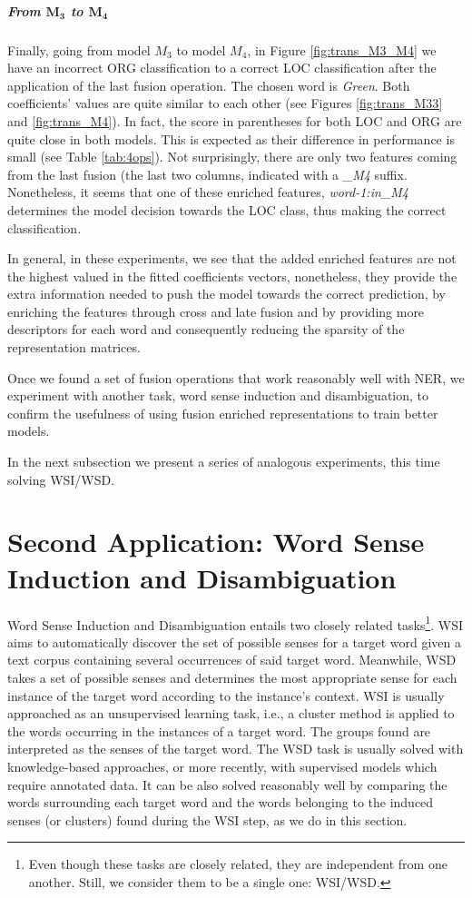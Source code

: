 \subparagraph{From $\mathbf{M_3}$ to $\mathbf{M_4}$} Finally, going from model $M_3 $ to model $M_4$, in Figure \ref{fig:trans_M3_M4} we have an incorrect ORG classification to a correct LOC classification after the application of the last fusion operation. The chosen word is \textit{Green}. Both coefficients' values are quite similar  to each other (see Figures \ref{fig:trans_M33} and \ref{fig:trans_M4}). In fact, the score in parentheses for both LOC and ORG are quite close in both models. This is expected as their difference in performance is small (see Table \ref{tab:4ops}). Not surprisingly, there are only two features coming from the last fusion (the last two columns, indicated with a \textit{\_M4} suffix. Nonetheless, it seems that one of these enriched features, \textit{word-1:in\_M4} determines the model decision towards the LOC class, thus making the correct classification.

In general, in these experiments, we see that the added enriched features are not the highest valued in the fitted coefficients vectors, nonetheless, they  provide the extra information needed to push the model towards the correct prediction, by enriching the features through cross and late fusion and by providing more descriptors for each word and consequently reducing the sparsity of the representation matrices.

Once we found a set of fusion operations that work reasonably well with NER, we experiment with another task, word sense induction and disambiguation, to confirm the usefulness of using fusion enriched representations to train better models.

In the next subsection we present a series of analogous experiments, this time solving WSI/WSD.


\section{Second Application: Word Sense Induction and Disambiguation}
\label{sec:wsd_wsi}
Word Sense Induction and Disambiguation entails two closely related tasks\footnote{Even though these tasks are closely related, they are independent from one another. Still,  we consider them to be a single one: WSI/WSD.}. WSI aims to automatically discover the set of possible senses for a target word given a text corpus containing several occurrences of said target word. Meanwhile, WSD takes a set of possible senses and determines the most appropriate sense for each instance of the target word according to the instance's context. WSI is usually approached as an unsupervised learning task, i.e., a cluster method is applied to the words occurring in the instances of a target word. The groups found are interpreted as the senses of the target word. The WSD task is usually solved with knowledge-based approaches, or more recently, with supervised models which require annotated data. It can be also solved reasonably well by comparing the words surrounding each target word and the words belonging to the induced senses (or clusters) found during the WSI step, as we do in this section.

